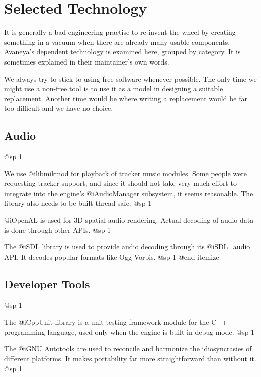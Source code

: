 \chapter{Selected Technology}
It is generally a bad engineering practise to re-invent the wheel by creating something in a vacuum when there are already many usable components. Avaneya's dependent technology is examined here, grouped by category. It is sometimes explained in their maintainer's own words.

We always try to stick to using free software whenever possible. The only time we might use a non-free tool is to use it as a model in designing a suitable replacement. Another time would be where writing a replacement would be far too difficult and we have no choice.

\section{Audio}
@sp 1

\itemize
\item
We use @i{libmikmod} for playback of tracker music modules. Some people were requesting tracker support, and since it should not take very much effort to integrate into the engine's @i{AudioManager} subsystem, it seems reasonable. The library also needs to be built thread safe.
@sp 1

\item
@i{OpenAL} is used for 3D spatial audio rendering. Actual decoding of audio data is done through other APIs.
@sp 1

\item
The @i{SDL} library is used to provide audio decoding through its @i{SDL_audio} API. It decodes popular formats like Ogg Vorbis.
@sp 1
@end itemize

\section{Developer Tools}
@sp 1

\itemize
\item
The @i{CppUnit} library is a unit testing framework module for the C++ programming language, used only when the engine is built in debug mode.
@sp 1

\item
The @i{GNU Autotools} are used to reconcile and harmonize the idiosyncrasies of different platforms. It makes portability far more straightforward than without it.
@sp 1


